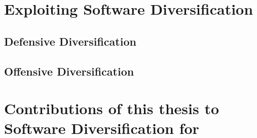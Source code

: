 \section{Exploiting Software Diversification}

\subsection{Defensive Diversification}

\subsection{Offensive Diversification}

\section{Contributions of this thesis to Software Diversification for \Wasm}

